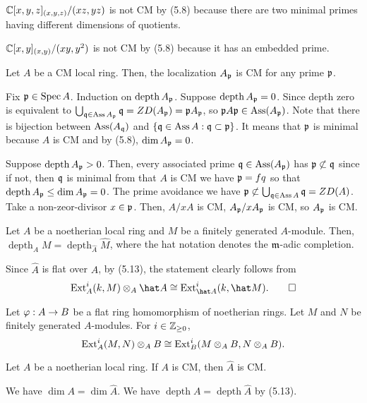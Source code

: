 \documentclass{../../../small}
\newcommand{\depth}{\operatorname{depth}}
\newcommand{\Ass}{\operatorname{Ass}}
\begin{document}
\begin{ex*}[5.9]
$\mathbb{C}[x,y,z]_{(x,y,z)}/(xz,yz)$ is not CM by (5.8) because there are two minimal primes having different dimensions of quotients.
\end{ex*}

\begin{ex*}[5.10]
$\mathbb{C}[x,y]_{(x,y)}/(xy,y^2)$ is not CM by (5.8) because it has an embedded prime.
\end{ex*}

\begin{prop*}[5.11]
Let $A$ be a CM local ring.
Then, the localization $A_{\mathfrak{p}}$ is CM for any prime $\mathfrak{p}$.
\end{prop*}
\begin{pf}
Fix $\mathfrak{p}\in\operatorname{Spec} A$.
Induction on $\depth A_\fp$.
Suppose $\depth A_\fp=0$.
Since depth zero is equivalent to $\bigcup_{\fq\in\Ass A_\fp}\fq=ZD(A_\fp)=\fp A_\fp$, so $\fp A\fp\in\Ass(A_\fp)$.
Note that there is bijection between $\Ass(A_\fq)$ and $\{\fq\in\Ass A:\fq\subset\fp\}$.
It means that $\mathfrak{p}$ is minimal because $A$ is CM and by (5.8), $\dim A_{\mathfrak{p}}=0$.

Suppose $\depth A_\fp>0$.
Then, every associated prime $\fq\in\Ass(A_\fp)$ has $\mathfrak{p}\not\subset\mathfrak{q}$ since if not, then $\mathfrak{q}$ is minimal from that $A$ is CM we have $\mathfrak{p}=fq$ so that $\depth A_\fp\le\dim A_\fp=0$.
The prime avoidance we have $\fp\not\subset\bigcup_{\fq\in\Ass A}\fq=ZD(A)$.
Take a non-zeor-divisor $x\in\mathfrak{p}$.
Then, $A/xA$ is CM, $A_{\mathfrak{p}}/xA_{\mathfrak{p}}$ is CM, so $A_{\mathfrak{p}}$ is CM.
\end{pf}

\begin{prop*}[5.12]
Let $A$ be a noetherian local ring and $M$ be a finitely generated $A$-module.
Then, $\depth_AM=\depth_{\hat A}\hat M$, where the hat notation denotes the $\mathfrak{m}$-adic completion.
\end{prop*}
\begin{pf}
Since $\hat A$ is flat over $A$, by (5.13), the statement clearly follows from
\[\Ext_A^i(k,M)\otimes_A\hat A\cong\Ext_{\hat A}^i(k,\hat M).\qedhere\]
\end{pf}

\begin{exe*}[5.13]
Let $\varphi:A\to B$ be a flat ring homomorphism of noetherian rings.
Let $M$ and $N$ be finitely generated $A$-modules.
For $i\in\mathbb{Z}_{\ge0}$,
\[\operatorname{Ext}_A^i(M,N)\otimes_AB\cong\operatorname{Ext}_B^i(M\otimes_AB,N\otimes_AB).\]
\end{exe*}

\begin{cor*}[5.14]
Let $A$ be a noetherian local ring.
If $A$ is CM, then $\hat A$ is CM.
\end{cor*}
\begin{pf}
We have $\dim A=\dim\hat A$.
We have $\depth A=\depth\hat A$ by (5.13).
\end{pf}
\end{document}
